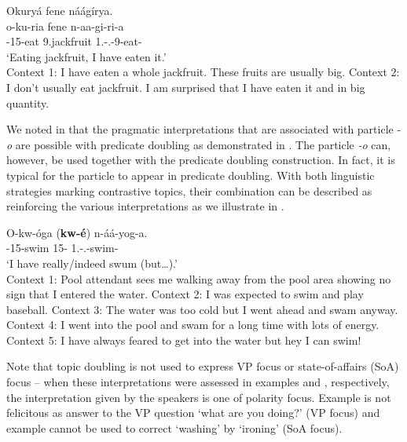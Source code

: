 \documentclass[output=paper]{langscibook}
\begin{document}
\ea
\label{bkm:Ref116286044}
\label{bkm:Ref127888871}Okuryá fene náágírya.\\
\gll
o-ku-ria  fene  n-aa-gi-ri-a\\
\AUG{}-15-eat  9.jackfruit  1\SG{}.\SM{}-\N{}.\PST{}-9\OM{}-eat-\FV{}\\
\glt
‘Eating jackfruit, I have eaten it.’\\

\settowidth\jamwidth{[intensive]}
\sn Context 1:  I have eaten a whole jackfruit. These fruits are usually big. \jambox*{[intensive]}
\sn
Context 2:  I don’t usually eat jackfruit. I am surprised that I have eaten it and in big quantity. \jambox*{[mirative]}

\z

We noted in  that the pragmatic interpretations that are associated with particle -\textit{o} are possible with predicate doubling as demonstrated in . The particle \textit{-o} can, however, be used together with the predicate doubling construction. In fact, it is typical for the particle to appear in predicate doubling. With both linguistic strategies marking contrastive topics, their combination can be described as reinforcing the various interpretations as we illustrate in .

\ea
\label{bkm:Ref118708342}
\gll
O-kw-óga  (\textbf{kw-é})  n-áá-yog-a.\\
\AUG{}-15-swim  {\db}15-\CM{}  1\SG{}.\SM{}-\N{}.\PST{}-swim-\FV{}\\
\glt `I have really/indeed swum (but…).’\\

\settowidth\jamwidth{[depreciative]}
\sn
Context 1: Pool attendant sees me walking away from the pool area showing no sign that I entered the water. \jambox*{[verum]}
\sn
Context 2: I was expected to swim and play baseball. \jambox*{[contrast]}
\sn
Context 3: The water was too cold but I went ahead and swam anyway. \jambox*{[depreciative]}
\sn
Context 4: I went into the pool and swam for a long time with lots of energy. \jambox*{[intensity]}
\sn
Context 5: I have always feared to get into the water but hey I can swim! \jambox*{[mirative]}

\z

Note that topic doubling is not used to express VP focus or state-of-affairs (SoA) focus – when these interpretations were assessed in examples  and , respectively, the interpretation given by the speakers is one of polarity focus. Example  is not felicitous as answer to the VP question ‘what are you doing?’ (VP focus) and example  cannot be used to correct ‘washing’ by ‘ironing’ (SoA focus). 
\end{document}
